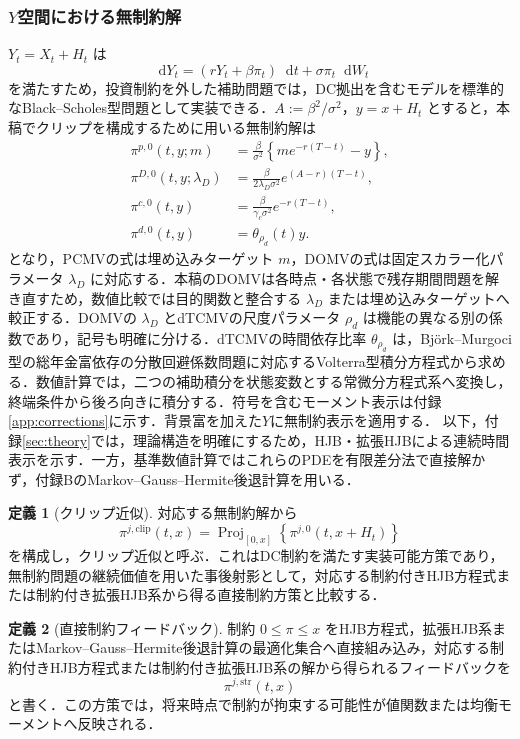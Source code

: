 \documentclass[10pt,a4paper]{article}
\theoremstyle{plain}
\theoremstyle{definition}
\newtheorem{definition}{定義}
\DeclareMathOperator{\Proj}{Proj}
\newcommand{\dd}{\mathop{}\!\mathrm{d}}
\begin{document}
\subsubsection{$Y$空間における無制約解}

$Y_t=X_t+H_t$ は
\[
\dd Y_t=(rY_t+\beta\pi_t)\dd t+\sigma\pi_t\dd W_t
\]
を満たすため，投資制約を外した補助問題では，DC拠出を含むモデルを標準的なBlack--Scholes型問題として実装できる．$A:=\beta^2/\sigma^2$，$y=x+H_t$ とすると，本稿でクリップを構成するために用いる無制約解は
\begin{align}
  \pi^{p,0}(t,y;m)
  &=\frac{\beta}{\sigma^2}\left\{m e^{-r(T-t)}-y\right\},\label{eq:unc-p}\\
  \pi^{D,0}(t,y;\lambda_D)
  &=\frac{\beta}{2\lambda_D\sigma^2}e^{(A-r)(T-t)},\label{eq:unc-D}\\
  \pi^{c,0}(t,y)
  &=\frac{\beta}{\gamma_c\sigma^2}e^{-r(T-t)},\label{eq:unc-c}\\
  \pi^{d,0}(t,y)
  &=\theta_{\rho_d}(t)y.\label{eq:unc-d}
\end{align}
となり，PCMVの式は埋め込みターゲット $m$，DOMVの式は固定スカラー化パラメータ $\lambda_D$ に対応する．本稿のDOMVは各時点・各状態で残存期間問題を解き直すため，数値比較では目的関数と整合する $\lambda_D$ または埋め込みターゲットへ較正する．DOMVの $\lambda_D$ とdTCMVの尺度パラメータ $\rho_d$ は機能の異なる別の係数であり，記号も明確に分ける．dTCMVの時間依存比率 $\theta_{\rho_d}$ は，Björk--Murgoci型の総年金富依存の分散回避係数問題に対応するVolterra型積分方程式から求める．数値計算では，二つの補助積分を状態変数とする常微分方程式系へ変換し，終端条件から後ろ向きに積分する．符号を含むモーメント表示は付録\ref{app:corrections}に示す．背景富を加えた$Y$に無制約表示を適用する．
以下，付録\ref{sec:theory}では，理論構造を明確にするため，HJB・拡張HJBによる連続時間表示を示す．一方，基準数値計算ではこれらのPDEを有限差分法で直接解かず，付録BのMarkov--Gauss--Hermite後退計算を用いる．

\begin{definition}[クリップ近似]
対応する無制約解から
\begin{equation}
  \pi^{j,\mathrm{clip}}(t,x)
  =\Proj_{[0,x]}\!\left\{\pi^{j,0}(t,x+H_t)\right\}
  \label{eq:クリップ-def}
\end{equation}
を構成し，クリップ近似と呼ぶ．これはDC制約を満たす実装可能方策であり，無制約問題の継続価値を用いた事後射影として，対応する制約付きHJB方程式または制約付き拡張HJB系から得る直接制約方策と比較する．
\end{definition}

\begin{definition}[直接制約フィードバック]
制約 $0\leq\pi\leq x$ をHJB方程式，拡張HJB系またはMarkov--Gauss--Hermite後退計算の最適化集合へ直接組み込み，対応する制約付きHJB方程式または制約付き拡張HJB系の解から得られるフィードバックを
\[
  \pi^{j,\mathrm{str}}(t,x)
\]
と書く．この方策では，将来時点で制約が拘束する可能性が値関数または均衡モーメントへ反映される．
\end{definition}
\end{document}
